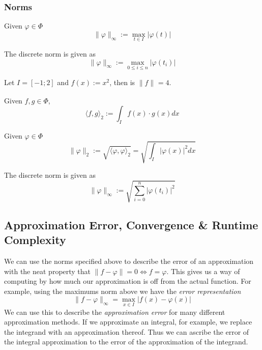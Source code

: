 \subsubsection{Norms}
\begin{definition}
   Given \(\varphi \in \Phi\)
   \[\|\varphi\|_\infty := \max_{t \in I} |\varphi(t)|\]
\end{definition}
\begin{remark}
   The discrete norm is given as
   \[\|\varphi\|_\infty := \max_{0 \leq i \leq n} |\varphi(t_i)|\]
\end{remark}
\begin{example}
   Let \(I = [-1; 2]\) and \(f(x) := x^2\), then is \(\|f\|_{} = 4\).
\end{example}

\begin{definition}\label{def:l2_scal_prod}
   Given \(f, g \in \Phi\),
   \[\langle f, g\rangle_2 := \int_I f(x) \cdot g(x) dx\]
\end{definition}

\begin{definition}[\(L^2\)-Norm]\label{def:l2_norm}
   Given \(\varphi \in \Phi\)
   \[\|\varphi\|_2 := \sqrt{\langle \varphi, \varphi\rangle_2} = \sqrt{\int_I |\varphi(x)|^2 dx}\]
\end{definition}
\begin{remark}
   The discrete norm is given as
   \[\|\varphi\|_\infty := \sqrt{\sum_{i=0}^n |\varphi(t_i)|^2}\]
\end{remark}

\subsection{Approximation Error, Convergence \& Runtime Complexity}
We can use the norms specified above to describe the error of an approximation with the neat property that \(\|f - \varphi\| = 0 \iff f = \varphi\).
This gives us a way of computing by how much our approximation is off from the actual function.
For example, using the maximums norm above we have the \emph{error representation}
\[\|f - \varphi\|_\infty = \max_{x \in I} |f(x) - \varphi(x)|\]
We can use this to describe the \emph{approximation error} for many different approximation methods.
If we approximate an integral, for example, we replace the integrand with an approximation thereof.
Thus we can ascribe the error of the integral approximation to the error of the approximation of the integrand.

